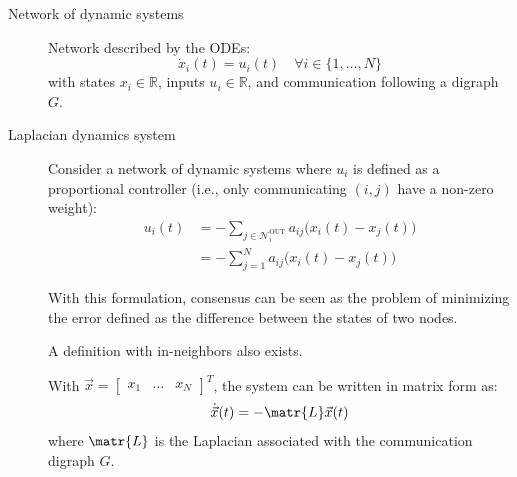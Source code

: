 \begin{description}
    \item[Network of dynamic systems] 
        Network described by the ODEs:
        \[ \dot{x}_i(t) = u_i(t) \quad \forall i \in \{ 1, \dots, N \} \]
        with states $x_i \in \mathbb{R}$, inputs $u_i \in \mathbb{R}$, and communication following a digraph $G$.

    \item[Laplacian dynamics system] 
        Consider a network of dynamic systems where $u_i$ is defined as a proportional controller (i.e., only communicating $(i, j)$ have a non-zero weight):
        \[ 
            \begin{split}
                u_i(t) 
                    &= - \sum_{j \in \mathcal{N}_i^\text{OUT}} a_{ij} \Big( x_i(t) - x_j(t) \Big) \\
                    &= - \sum_{j=1}^{N} a_{ij} \Big( x_i(t) - x_j(t) \Big) 
            \end{split}
        \]

        \begin{remark}
            With this formulation, consensus can be seen as the problem of minimizing the error defined as the difference between the states of two nodes.
        \end{remark}

        \begin{remark}
            A definition with in-neighbors also exists.
        \end{remark}


        \begin{theorem} \label{th:lti_continuous} 
            With $\vec{x} = \begin{bmatrix} x_1 & \dots & x_N \end{bmatrix}^T$, the system can be written in matrix form as:
            \[ \dot{\vec{x}}(t) = - \matr{L} \vec{x}(t) \]
            where $\matr{L}$ is the Laplacian associated with the communication digraph $G$.


\end{theorem}
\end{description}
